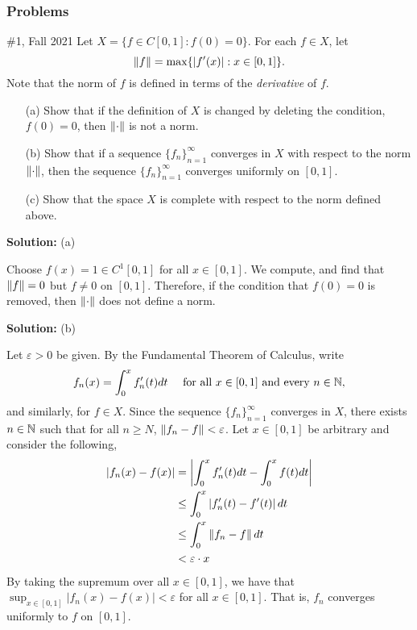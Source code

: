 \documentclass{article}
\begin{document}
\subsubsection{Problems}

\begin{problem}{\#1, Fall 2021} Let $X = \{f \in C[0,1] : f(0) = 0\}$. For each $f\in X$, let 
	\[\left\lVert { f } \right\rVert = \max\{ |f'(x)| : x\in [0,1]\}.\]
Note that the norm of $f$ is defined in terms of the \textit{derivative} of $f$. 
\begin{enumerate}
	\item[(a)] Show that if the definition of $X$ is changed by deleting the condition, $f(0) = 0$, 
		then $\left\lVert {\cdot} \right\rVert$ is not a norm. 
	\item[(b)] Show that if a sequence $\{f_n\}_{n=1}^\infty$ converges in $X$ with respect to the norm $\left\lVert {\cdot} \right\rVert$,
		then the sequence $\{f_n\}_{n=1}^\infty$ converges uniformly on $[0,1]$.
	\item[(c)] Show that the space $X$ is complete with respect to the norm defined above.
\end{enumerate}

\end{problem}

\textbf{Solution:} (a) 

Choose $f(x) = 1\in C^1[0,1]$ for all $x\in [0,1]$. We compute, and find that $\left\lVert {f} \right\rVert = 0$ but $f\neq0$ on $[0,1]$.
Therefore, if the condition that $f(0) = 0$ is removed, then $\left\lVert {\cdot} \right\rVert$ does not define a norm.

\textbf{Solution:} (b) 

Let $\varepsilon > 0$ be given. By the Fundamental Theorem of Calculus, write 
	\begin{equation}\label{eqn:fall2021-1-ftc}
	 	f_n(x) = \int_0^x f'_n(t) dt \quad \text{ for all } x\in [0,1] \text{ and every } n\in \mathbb N,
	 \end{equation}
and similarly, for $f\in X$. Since the sequence $\{f_n\}_{n=1}^\infty$ converges in $X$, there exists $n\in \mathbb N$ 
such that for all $n\geq N$, $\left\lVert {f_n - f} \right\rVert<\varepsilon$. Let $x\in[0,1]$ be arbitrary and consider the following, 
	\begin{align*}
		|f_n(x) - f(x)| & = \left| \int_0^x f'_n(t) dt - \int_0^x f(t) dt \right|\\
				    & \leq \int_0^x \left| f'_n(t) - f'(t) \right| dt\\
				    & \leq \int_0^x \left\lVert {f_n - f} \right\rVert dt\\
				    & < \varepsilon \cdot x
	\end{align*}
By taking the supremum over all $x\in [0,1]$, we have that $\sup_{x\in [0,1]} |f_n(x) - f(x)| < \varepsilon$ for all $x\in [0,1]$.
That is, $f_n$ converges uniformly to $f$ on $[0,1]$.
\end{document}
